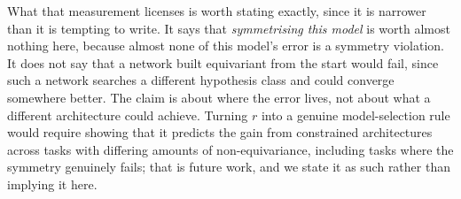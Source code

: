 \documentclass[10pt,twocolumn,letterpaper]{article}
\theoremstyle{plain}
\begin{document}
What that measurement licenses is worth stating exactly, since it is narrower
than it is tempting to write. It says that \emph{symmetrising this model} is
worth almost nothing here, because almost none of this model's error is a
symmetry violation. It does not say that a network built equivariant from the
start would fail, since such a network searches a different hypothesis class and
could converge somewhere better. The claim is about where the error lives, not
about what a different architecture could achieve. Turning $r$ into a genuine
model-selection rule would require showing that it predicts the gain from
constrained architectures across tasks with differing amounts of
non-equivariance, including tasks where the symmetry genuinely fails; that is
future work, and we state it as such rather than implying it here.
\end{document}
